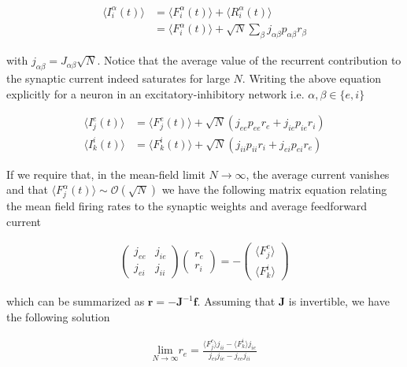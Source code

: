 \documentclass{ucetd}
\begin{document}
\begin{align*}
\langle I_{i}^{\alpha}(t)\rangle &= \langle F_{i}^{\alpha}(t)\rangle + \langle R_{i}^{\alpha}(t)\rangle\\
&= \langle F_{i}^{\alpha}(t)\rangle + \sqrt{N}\sum_{\beta}j_{\alpha\beta}p_{\alpha\beta}r_{\beta}
\end{align*}

with $j_{\alpha\beta} = J_{\alpha\beta}\sqrt{N}$. Notice that the average value of the recurrent contribution to the synaptic current indeed saturates for large $N$. Writing the above equation explicitly for a neuron in an excitatory-inhibitory network i.e. $\alpha, \beta \in \{e, i\}$

\begin{align}
\langle I_{j}^{e}(t)\rangle &= \langle F_{j}^{e}(t)\rangle + \sqrt{N}\left(j_{ee}p_{ee}r_{e} + j_{ie}p_{ie}r_{i}\right)\\
\langle I_{k}^{i}(t)\rangle &= \langle F_{k}^{i}(t)\rangle + \sqrt{N}\left(j_{ii}p_{ii}r_{i} + j_{ei}p_{ei}r_{e}\right)
\end{align}

If we require that, in the mean-field limit $N\rightarrow\infty$, the average current vanishes and that $\langle F_{j}^{\alpha}(t)\rangle \sim \mathcal{O}(\sqrt{N})$ we have the following matrix equation relating the mean field firing rates to the synaptic weights and average feedforward current

\begin{align}
\begin{pmatrix}
j_{ee} & j_{ie}\\
j_{ei} & j_{ii}
\end{pmatrix}
\begin{pmatrix}
r_{e}\\
r_{i}
\end{pmatrix}
= 
-\begin{pmatrix}
\langle F_{j}^{e}\rangle\\
\langle F_{k}^{i}\rangle
\end{pmatrix}
\end{align}

which can be summarized as $\mathbf{r} = -\mathbf{J}^{-1}\mathbf{f}$. Assuming that $\mathbf{J}$ is invertible, we have the following solution

\begin{align}
\underset{N\rightarrow \infty}{\mathrm{lim}}r_{e} = \frac{\langle F_{j}^{e}\rangle j_{ii}-\langle F_{k}^{i}\rangle j_{ie}}{j_{ei}j_{ie} - j_{ee}j_{ii}}
\end{align}
\end{document}
